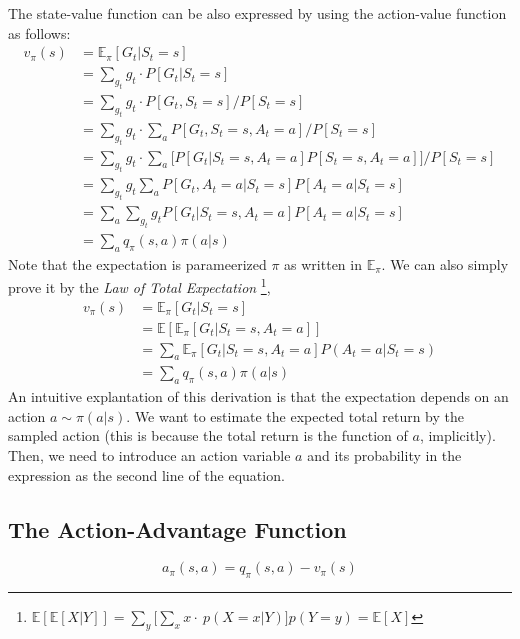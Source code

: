 The state-value function can be also expressed by using the action-value function as follows:
\begin{align*}
	v_\pi(s) &= \mathbb{E}_{\pi}[G_t|S_t = s]\\ 
	&= \sum_{g_t} g_t\cdot P[G_t|S_t=s]\\
	&= \sum_{g_t} g_t\cdot P[G_t,S_t=s]/P[S_t=s]\\
	&= \sum_{g_t} g_t\cdot \sum_a P[G_t,S_t=s, A_t=a]/P[S_t=s]\\
	&= \sum_{g_t} g_t\cdot \sum_a \Big[P[G_t|S_t=s, A_t=a]P[S_t=s, A_t=a]\Big]/P[S_t=s]\\
	&= \sum_{g_t} g_t \sum_a P[G_t, A_t=a|S_t=s] P[A_t=a|S_t=s]\\
	&= \sum_{a} \sum_{g_t} g_t P[G_t|S_t=s, A_t=a] P[A_t=a|S_t=s]\\
	&= \sum_{a} q_\pi(s,a) \pi(a|s)
\end{align*}
Note that the expectation is parameerized $\pi$ as written in $\mathbb{E}_{\pi}$. We can also simply prove it by the \textit{Law of Total Expectation} \footnote{
$\mathbb{E}[\mathbb{E}[X|Y]] = \sum_{y}\Big[\sum_{x}x\cdot\ p(X=x|Y)\Big] p(Y=y) = \mathbb{E}[X]$},
\begin{align*}
	v_\pi(s) &= \mathbb{E}_{\pi}[G_t|S_t = s]\\ 
	&= \mathbb{E}[\mathbb{E}_{\pi}[G_t|S_t=s, A_t=a]]\\
	&= \sum_{a} \mathbb{E}_{\pi}[G_t|S_t=s, A_t=a] P(A_t = a|S_t = s)\\
	&= \sum_{a} q_\pi(s,a) \pi(a|s)
\end{align*}
An intuitive explantation of this derivation is that the expectation depends on an action $a\sim \pi(a|s)$. We want to estimate the expected total return by the sampled action (this is because the total return is the function of $a$, implicitly). Then, we need to introduce an action variable $a$ and its probability in the expression as the second line of the equation. 

\subsection{The Action-Advantage Function}

\begin{definition}
	$$a_{\pi}(s,a) = q_\pi(s,a)-v_\pi(s)$$
\end{definition}

